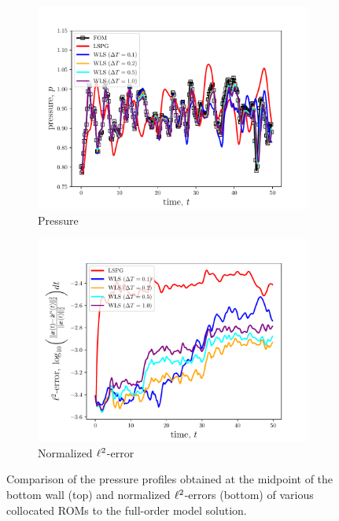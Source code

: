 \begin{figure}
\begin{center}

\begin{subfigure}[t]{0.495\textwidth}
\includegraphics[trim={0cm 00.0cm 0cm 0cm},clip,width=1.\linewidth]{figs/cavity_new/p_vs_t.pdf}
\caption{Pressure} 
\label{fig:cav_results1a}
\end{subfigure}
\begin{subfigure}[t]{0.495\textwidth}
\includegraphics[trim={0cm 0cm 0cm 0cm},clip,width=1.\linewidth]{figs/cavity_new/error_vs_t.pdf}
\caption{Normalized $\ell^2$-error}
\label{fig:cav_results1b}
\end{subfigure}

\end{center}
\caption{Comparison of the pressure profiles obtained at the midpoint of the bottom wall (top) and normalized $\ell^2$-errors (bottom) of various collocated ROMs to the full-order model solution.}
\label{fig:cav_results1}
\end{figure}

